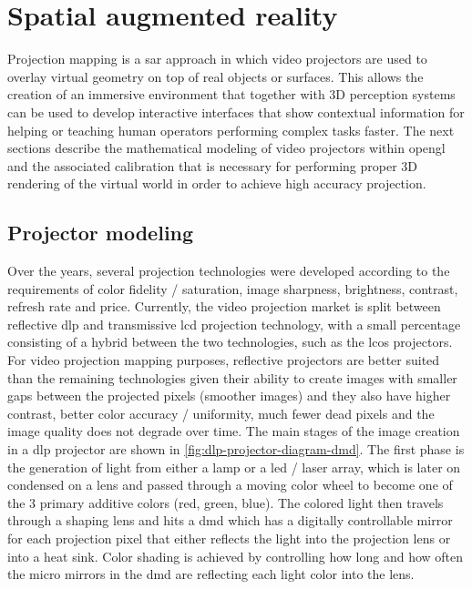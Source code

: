 \section{Spatial augmented reality}\label{sec:sar}

Projection mapping is a \gls{sar} \cite{Bimber2005} approach in which video projectors are used to overlay virtual geometry on top of real objects or surfaces. This allows the creation of an immersive environment that together with 3D perception systems can be used to develop interactive interfaces that show contextual information for helping or teaching human operators performing complex tasks faster. The next sections describe the mathematical modeling of video projectors within \gls{opengl} and the associated calibration that is necessary for performing proper 3D rendering of the virtual world in order to achieve high accuracy projection.


\subsection{Projector modeling}

Over the years, several projection technologies were developed according to the requirements of color fidelity / saturation, image sharpness, brightness, contrast, refresh rate and price. Currently, the video projection market is split between reflective \gls{dlp} and transmissive \gls{lcd} projection technology, with a small percentage consisting of a hybrid between the two technologies, such as the \gls{lcos} projectors. For video projection mapping purposes, reflective projectors are better suited than the remaining technologies given their ability to create images with smaller gaps between the projected pixels (smoother images) and they also have higher contrast, better color accuracy / uniformity, much fewer dead pixels and the image quality does not degrade over time. The main stages of the image creation in a \gls{dlp} projector are shown in \cref{fig:dlp-projector-diagram-dmd}. The first phase is the generation of light from either a lamp or a \gls{led} / laser array, which is later on condensed on a lens and passed through a moving color wheel to become one of the 3 primary additive colors (red, green, blue). The colored light then travels through a shaping lens and hits a \gls{dmd} which has a digitally controllable mirror for each projection pixel that either reflects the light into the projection lens or into a heat sink. Color shading is achieved by controlling how long and how often the micro mirrors in the \gls{dmd} are reflecting each light color into the lens.

